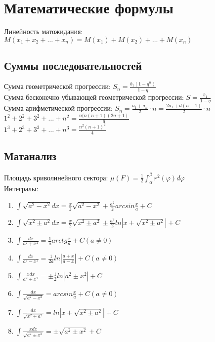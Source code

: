 \documentclass{article}
\begin{document}
\section*{Математические формулы}
Линейность матожидания: $M(x_1 + x_2 + \dots + x_n) = M(x_1) + M(x_2) + \dots + M(x_n)$ \\
\subsection*{Суммы последовательностей}
Сумма геометрической прогрессии: $S_n = \frac{b_1 (1 - q^n)}{1 - q}$ \\
Сумма бесконечно убывающей геометрической прогрессии: $S = \frac{b_1}{1 - q}$ \\
Сумма арифметической прогрессии: $S_n = \frac{a_1 + a_n}{2} \cdot n = \frac{2a_1 + d(n - 1)}{2} \cdot n$ \\
$1^2 + 2^2 + 3^2 + \dots + n^2 = \frac{n(n(n + 1)(2n + 1)}{6}$ \\
$1^3 + 2^3 + 3^3 + \dots + n^3 = \frac{n^2 (n + 1)^2}{4}$ \\
\subsection*{Матанализ}
Площадь криволинейного сектора: $\mu(F) = \frac{1}{2} \int_{\alpha}^{\beta} r^2(\varphi) d\varphi$ \\
Интегралы:
\begin{enumerate}
	\item $ \int \sqrt{a^2 - x^2} dx = \frac{x}{2} \sqrt{a^2 - x^2} + \frac{a^2}{2} arcsin \frac{x}{a} + C $ \\
	\item $ \int \sqrt{x^2 \pm a^2} dx = \frac{x}{2} \sqrt {x^2 \pm a^2} \pm \frac{a^2}{2} ln |x + \sqrt{x^2 \pm a^2}| + C $ \\
	\item $ \int \frac{dx}{a^2 + x^2} = \frac{1}{a} arctg \frac{x}{a} + C (a \ne 0) $ \\
	\item $ \int \frac{dx}{a^2 - x^2} = \frac{1}{2a} ln |\frac{a + x}{a - x}| + C (a \ne 0) $ \\
	\item $ \int \frac{x dx}{a^2 \pm x^2} = \pm \frac{1}{2} ln |a^2 \pm x^2| + C $ \\
	\item $ \int \frac{dx}{\sqrt{a^2 - x^2}} = arcsin \frac{x}{a} + C (a \ne 0) $ \\
	\item $ \int \frac{dx}{\sqrt{x^2 \pm a^2}} = ln |x + \sqrt{x^2 \pm a^2}| + C $ \\
	\item $ \int \frac{x dx}{\sqrt{a^2 \pm x^2}} = \pm \sqrt{a^2 \pm x^2} + C $ \\
\end{enumerate}
\end{document}
